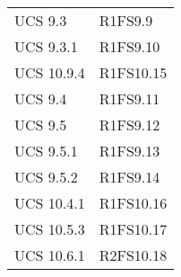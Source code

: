 {\begin{longtable}{ C{4cm} C{4cm}}
UCS 9.3 & R1FS9.9\\

UCS 9.3.1 & R1FS9.10\\

UCS 10.9.4 & R1FS10.15\\

UCS 9.4 & R1FS9.11\\

UCS 9.5 & R1FS9.12\\

UCS 9.5.1 & R1FS9.13\\

UCS 9.5.2 & R1FS9.14\\

UCS 10.4.1 & R1FS10.16\\

UCS 10.5.3 & R1FS10.17\\

UCS 10.6.1 & R2FS10.18\\

\end{longtable}
}